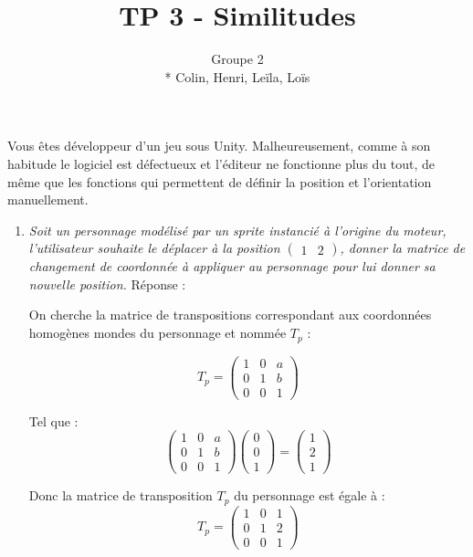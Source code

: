 \documentclass[a4paper,12pt]{article}
\title{TP 3 - Similitudes}
\author{Groupe 2 \\* Colin, Henri, Leïla, Loïs}
\begin{document}
\maketitle

Vous êtes développeur d'un jeu sous Unity. Malheureusement, comme à son habitude le logiciel est défectueux et l'éditeur ne fonctionne plus du tout, de même que les fonctions qui permettent de définir la position et l'orientation manuellement. 
\begin{enumerate}
    \item \emph{Soit un personnage modélisé par un sprite instancié à l'origine du moteur, l'utilisateur souhaite le déplacer à la position $\begin{pmatrix} 1 & 2\end{pmatrix}$, donner la matrice de changement de coordonnée à appliquer au personnage pour lui donner sa nouvelle position.}\label{exo:1.1}\newline \newline
Réponse :

On cherche la matrice de transpositions correspondant aux coordonnées homogènes mondes du personnage et nommée $T_p$ : 

 \begin{equation}
T_p = 
\begin{pmatrix}
1 & 0 & a \\
0 & 1 & b \\
0 & 0 & 1
\end{pmatrix} \end{equation}

Tel que : 
 \begin{equation}\begin{pmatrix}
1 & 0 & a \\
0 & 1 & b \\
0 & 0 & 1
\end{pmatrix}
\begin{pmatrix}
0 \\
0 \\
1 
\end{pmatrix}
=
\begin{pmatrix}
1 \\
2 \\
1
\end{pmatrix} \end{equation}

Donc la matrice de transposition $T_p$ du personnage est égale à :
 \begin{equation}\boxed{
T_p = 
\begin{pmatrix}
1 & 0 & 1 \\
0 & 1 & 2 \\
0 & 0 & 1
\end{pmatrix}} \end{equation} \newline


\end{enumerate}
\end{document}
